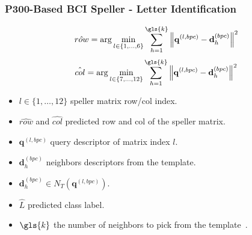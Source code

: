 \documentclass[aspectratio=169]{beamer}
\begin{document}
\begin{frame}
\frametitle{P300-Based BCI Speller - Letter Identification}
\begin{center}
\vspace{-\baselineskip}
\vspace{-\baselineskip}
\begin{equation}
\hat{row} = \arg \min_{l \in \{1,\dots,6\}} \sum_{h=1}^{\gls{k}}  {\left\lVert \mathbf{q}^{(l,bpc)} -  \mathbf{d}_{h}^{(bpc)} \right\rVert}  ^{2}
\label{eq:multiclassificationrow}
\end{equation}
\begin{equation}
\hat{col} = \arg \min_{l \in \{7,\dots,12\}} \sum_{h=1}^{\gls{k}}  {\left\lVert \mathbf{q}^{(l,bpc)} -  \mathbf{d}_{h}^{(bpc)} \right\rVert}  ^{2}
\label{eq:multiclassificationcol}
\end{equation}

\begin{itemize}
\item $l \in \{1,\dots,12\}$ speller matrix row/col index.
\item $\hat{row}$  and $\hat{col}$ predicted row and col of the speller matrix.
\item $\mathbf{q}^{(l,bpc)} $ query descriptor of matrix index $l$.
\item $\mathbf{d}_{h}^{(bpc)} $ neighbors descriptors from the template.
\item $\mathbf{d}_{h}^{(bpc)} \in N_T(  \mathbf{q}^{(l,bpc)} )$.
\item $\hat{L}$ predicted class label.
\item $\gls{k}$ the number of neighbors to pick from the template~.
\end{itemize}

\end{center}
\end{frame}   
\end{document}
